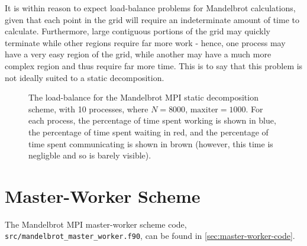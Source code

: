 \documentclass{article}
\begin{document}
It is within reason to expect load-balance problems for Mandelbrot calculations,
given that each point in the grid will require an indeterminate amount of time
to calculate.
Furthermore, large contiguous portions of the grid may quickly terminate while
other regions require far more work - hence, one process may have a very easy
region of the grid, while another may have a much more complex region and thus
require far more time.
This is to say that this problem is not ideally suited to a static
decomposition.
\begin{figure}[h]
  \centering
  \caption{The load-balance for the Mandelbrot MPI static decomposition scheme,
    with 10 processes, where $N = 8000$, $\mathrm{maxiter} = 1000$. For each
    process, the percentage of time spent working is shown in blue, the
    percentage of time spent waiting in red, and the percentage of time spent
    communicating is shown in brown (however, this time is negligble and so is
    barely visible).}
  \label{fig:static-load-balance}
\end{figure}

\clearpage
\section{Master-Worker Scheme}
\label{sec:master-worker}

The Mandelbrot MPI master-worker scheme code,
\lstinline[style=ff]{src/mandelbrot_master_worker.f90}, can be
found in \autoref{sec:master-worker-code}.
\end{document}
